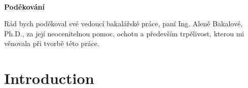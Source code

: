 \documentclass[a4paper,12pt]{report}
\begin{document}
\newpage 
\thispagestyle{empty} 


~ 
\vfill 

{\bf \noindent Poděkování} 

\vspace{0.5cm} 
Rád bych poděkoval své vedoucí bakalářské práce, paní Ing. Aleně Bakalové, Ph.D., za její neocenitelnou pomoc, ochotu a především trpělivost, kterou mi věnovala při tvorbě této práce.


\tableofcontents
\newpage


\newpage



\newpage  

%

\chapter*{Introduction}
    













\end{document}
